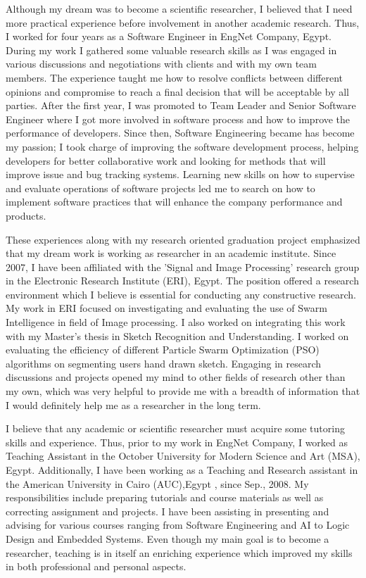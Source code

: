 \documentclass[10pt]{article}%
\begin{document}
	Although my dream was to become a scientific researcher, I believed that I need more practical experience before involvement in another academic research. Thus, I worked for four years as a Software Engineer in EngNet Company, Egypt. During my work I gathered some valuable research skills as I was engaged in various discussions and negotiations with clients and with my own team members. The experience taught me how to resolve conflicts between different opinions and compromise to reach a final decision that will be acceptable by all parties. After the first year, I was promoted to Team Leader and Senior Software Engineer where I got more involved in software process and how to improve the performance of developers. Since then, Software Engineering became has become my passion; I took charge of improving the software development process, helping developers for better collaborative work and looking for methods that will improve issue and bug tracking systems. Learning new skills on how to supervise and evaluate operations of software projects led me to search on how to implement software practices that will enhance the company performance and products.


 These experiences along with my research oriented graduation project emphasized that my dream work is working as researcher in an academic institute. Since 2007, I have been affiliated with the 'Signal and Image Processing' research group in the Electronic Research Institute (ERI), Egypt. The position offered a research environment which I believe is essential for conducting any constructive research. My work in ERI focused on investigating and evaluating the use of Swarm Intelligence in field of Image processing. I also worked on integrating this work with my Master's thesis in Sketch Recognition and Understanding. I worked on evaluating the efficiency of different Particle Swarm Optimization (PSO) algorithms on segmenting users hand drawn sketch. Engaging in research discussions and projects opened my mind to other fields of research other than my own, which was very helpful to provide me with a breadth of information that I would definitely help me as a researcher in the long term.

	I believe that any academic or scientific researcher must acquire some tutoring skills and experience. Thus, prior to my work in EngNet Company, I worked as Teaching Assistant in the October University for Modern Science and Art (MSA), Egypt. Additionally, I have been working as a Teaching and Research assistant in the American University in Cairo (AUC),Egypt , since Sep., 2008. My responsibilities include preparing tutorials and course materials as well as correcting assignment and projects. I have been assisting in presenting and advising for various courses ranging from Software Engineering and AI to Logic Design and Embedded Systems. Even though my main goal is to become a researcher, teaching is in itself an enriching experience which improved my skills in both professional and personal aspects.
\end{document}
